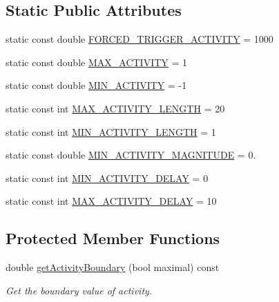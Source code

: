 \subsection*{\-Static \-Public \-Attributes}
\begin{DoxyCompactItemize}
\item 
static const double \hyperlink{classcryomesh_1_1components_1_1Impulse_aa581812f8f38b8a08d6f9ec9d301c455}{\-F\-O\-R\-C\-E\-D\-\_\-\-T\-R\-I\-G\-G\-E\-R\-\_\-\-A\-C\-T\-I\-V\-I\-T\-Y} = 1000
\item 
static const double \hyperlink{classcryomesh_1_1components_1_1Impulse_af8e9eb795f1ea3cef81d6afeb7166ad2}{\-M\-A\-X\-\_\-\-A\-C\-T\-I\-V\-I\-T\-Y} = 1
\item 
static const double \hyperlink{classcryomesh_1_1components_1_1Impulse_a3cc162bae9213a65a6aa241b256e1a84}{\-M\-I\-N\-\_\-\-A\-C\-T\-I\-V\-I\-T\-Y} = -\/1
\item 
static const int \hyperlink{classcryomesh_1_1components_1_1Impulse_a449f5f6a08af50b2e66703931ef3cd6c}{\-M\-A\-X\-\_\-\-A\-C\-T\-I\-V\-I\-T\-Y\-\_\-\-L\-E\-N\-G\-T\-H} = 20
\item 
static const int \hyperlink{classcryomesh_1_1components_1_1Impulse_ac24594fb7419a2f3e9f4d753dfae562f}{\-M\-I\-N\-\_\-\-A\-C\-T\-I\-V\-I\-T\-Y\-\_\-\-L\-E\-N\-G\-T\-H} = 1
\item 
static const double \hyperlink{classcryomesh_1_1components_1_1Impulse_a831758cc2e20d4a2d10b71f8c7698fd1}{\-M\-I\-N\-\_\-\-A\-C\-T\-I\-V\-I\-T\-Y\-\_\-\-M\-A\-G\-N\-I\-T\-U\-D\-E} = 0.
\item 
static const int \hyperlink{classcryomesh_1_1components_1_1Impulse_a7537a73569989ce84f0ab1b10e07ee94}{\-M\-I\-N\-\_\-\-A\-C\-T\-I\-V\-I\-T\-Y\-\_\-\-D\-E\-L\-A\-Y} = 0
\item 
static const int \hyperlink{classcryomesh_1_1components_1_1Impulse_afc1ae22e801a9dbf9bbb170d97d3411b}{\-M\-A\-X\-\_\-\-A\-C\-T\-I\-V\-I\-T\-Y\-\_\-\-D\-E\-L\-A\-Y} = 10
\end{DoxyCompactItemize}
\subsection*{\-Protected \-Member \-Functions}
\begin{DoxyCompactItemize}
\item 
double \hyperlink{classcryomesh_1_1components_1_1Impulse_a4bdb9cdab1998c670d3e7f46190fa45d}{get\-Activity\-Boundary} (bool maximal) const 
\begin{DoxyCompactList}\small\item\em \-Get the boundary value of activity. \end{DoxyCompactList}\end{DoxyCompactItemize}
